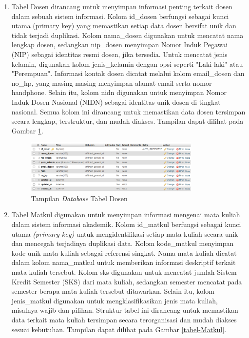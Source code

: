 \begin{enumerate}

	\item Tabel Dosen dirancang untuk menyimpan informasi penting terkait dosen dalam sebuah sistem informasi. Kolom id\_dosen berfungsi sebagai kunci utama (primary key) yang memastikan setiap data dosen bersifat unik dan tidak terjadi duplikasi. Kolom nama\_dosen digunakan untuk mencatat nama lengkap dosen, sedangkan nip\_dosen menyimpan Nomor Induk Pegawai (NIP) sebagai identitas resmi dosen, jika tersedia. Untuk mencatat jenis kelamin, digunakan kolom jenis\_kelamin dengan opsi seperti "Laki-laki" atau "Perempuan". Informasi kontak dosen dicatat melalui kolom email\_dosen dan no\_hp, yang masing-masing menyimpan alamat email serta nomor handphone. Selain itu, kolom nidn digunakan untuk menyimpan Nomor Induk Dosen Nasional (NIDN) sebagai identitas unik dosen di tingkat nasional. Semua kolom ini dirancang untuk memastikan data dosen tersimpan secara lengkap, terstruktur, dan mudah diakses. Tampilan dapat dilihat pada Gambar \ref{tabel-Dosen}.

	      \begin{figure}
		      \centering
		      \includegraphics[width=0.82\textwidth]{konten/gambar/implementasi/tabel-dosen.png}
		      \caption{Tampilan \textit{Database} Tabel Dosen}
		      \label{tabel-Dosen}
	      \end{figure}


	\item Tabel Matkul digunakan untuk menyimpan informasi mengenai mata kuliah dalam sistem informasi akademik. Kolom id\_matkul berfungsi sebagai kunci utama \textit{(primary key)} untuk mengidentifikasi setiap mata kuliah secara unik dan mencegah terjadinya duplikasi data. Kolom kode\_matkul menyimpan kode unik mata kuliah sebagai referensi singkat. Nama mata kuliah dicatat dalam kolom nama\_matkul untuk memberikan informasi deskriptif terkait mata kuliah tersebut. Kolom sks digunakan untuk mencatat jumlah Sistem Kredit Semester (SKS) dari mata kuliah, sedangkan semester mencatat pada semester berapa mata kuliah tersebut ditawarkan. Selain itu, kolom jenis\_matkul digunakan untuk mengklasifikasikan jenis mata kuliah, misalnya wajib dan pilihan. Struktur tabel ini dirancang untuk memastikan data terkait mata kuliah tersimpan secara terorganisasi dan mudah diakses sesuai kebutuhan. Tampilan dapat dilihat pada Gambar \ref{tabel-Matkul}.


\end{enumerate}
